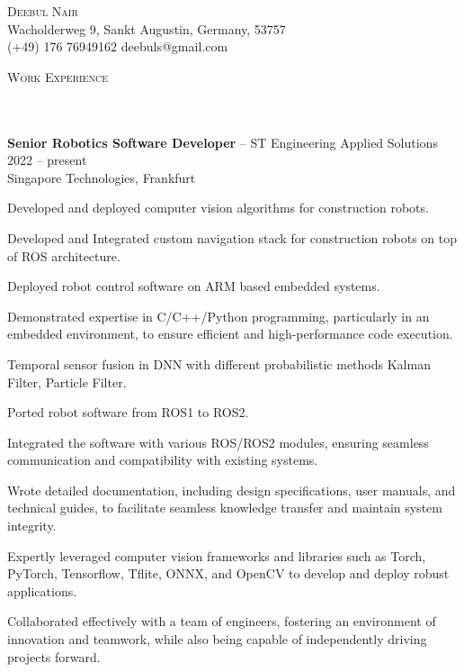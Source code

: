 \documentclass{article}
\newcommand{\contact}[3]{
\vspace*{5pt}
\begin{center}
{\Huge \scshape {#1}}\\
\vspace{3pt}
#2 
\vspace{2pt}
#3
\end{center}
\vspace*{-8pt}
}
\newcommand{\header}[1]{{
\hspace*{-15pt}\vspace*{6pt} \textsc{#1}} \vspace*{-6pt} 
\lineunder
}
\newcommand{\lineunder}{
\vspace*{-8pt} \\ \hspace*{-18pt} 
\hrulefill \\
}
\newcommand{\content}{
\vspace*{2pt}%
}
\newcommand{\employer}[4]{{
\vspace*{2pt}%
\textbf{#1} #2 \hfill #3\\ #4 \vspace*{2pt}}
}
\renewcommand{\labelitemi}{
	\raisebox{0.3ex}{\tiny\textbullet}
}
\renewcommand{\labelitemii}{
	\raisebox{0.3ex}{\tiny\textbullet}
}
\newenvironment{bullet-list-minor}{
\begin{list}{\labelitemii}{\setlength\leftmargin{15pt} 
\topsep 0pt \itemsep -2pt}}{\vspace*{4pt}\end{list}
}
\begin{document}
\small
\smallskip
\vspace*{-44pt}

\contact{Deebul Nair}
{Wacholderweg 9, Sankt Augustin, Germany, 53757\\}
{(+49) 176 76949162 \labelitemi deebuls@gmail.com}
\vspace{15pt}

\vspace*{4pt}%


\vspace*{4pt}%
\header{Work Experience}
    \employer{Senior Robotics Software Developer}{-- ST Engineering Applied Solutions }{2022 -- present}
    {Singapore Technologies, Frankfurt}
	\begin{bullet-list-minor}
        \item  Developed and deployed computer vision algorithms for construction robots. 
	\item Developed and Integrated custom navigation stack for construction robots on top of ROS architecture.
	\item  Deployed robot control software on ARM based embedded systems.
        \item  Demonstrated expertise in C/C++/Python programming, particularly in an embedded environment, to ensure efficient and high-performance code execution.
        \item  Temporal sensor fusion in DNN with different probabilistic methods Kalman Filter, Particle Filter. 
        \item  Ported robot software from ROS1 to ROS2.
        \item  Integrated the software with various ROS/ROS2 modules, ensuring seamless communication and compatibility with existing systems.
        \item  Wrote detailed documentation, including design specifications, user manuals, and technical guides, to facilitate seamless knowledge transfer and maintain system integrity.
        \item  Expertly leveraged computer vision frameworks and libraries such as Torch, PyTorch, Tensorflow, Tflite, ONNX, and OpenCV to develop and deploy robust applications.
        \item  Collaborated effectively with a team of engineers, fostering an environment of innovation and teamwork, while also being capable of independently driving projects forward.
        \end{bullet-list-minor}
\end{document}

